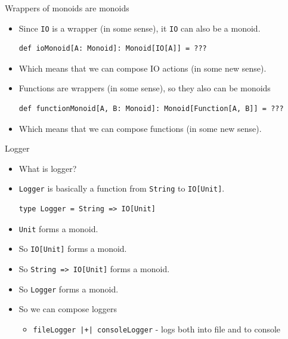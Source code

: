 \documentclass[presentation,aspectratio=169,smaller]{beamer}
\begin{document}
\begin{frame}[label={sec:org0d68a65},fragile]{Wrappers of monoids are monoids}
 \begin{itemize}
\item <1-> Since \texttt{IO} is a wrapper (in some sense), it \texttt{IO} can also be a monoid.
\begin{verbatim}
def ioMonoid[A: Monoid]: Monoid[IO[A]] = ???
\end{verbatim}
\item <2-> Which means that we can compose IO actions (in some new sense).
\item <3-> Functions are wrappers (in some sense), so they also can be monoids
\begin{verbatim}
def functionMonoid[A, B: Monoid]: Monoid[Function[A, B]] = ???
\end{verbatim}
\item <4-> Which means that we can compose functions (in some new sense).
\end{itemize}
\end{frame}

\begin{frame}[label={sec:org26cdb0f},fragile]{Logger}
 \begin{itemize}
\item <1-> What is logger?
\item <2-> \texttt{Logger} is basically a function from \texttt{String} to \texttt{IO[Unit]}.
\begin{verbatim}
type Logger = String => IO[Unit]
\end{verbatim}
\item <3-> \texttt{Unit} forms a monoid.
\item <4-> So \texttt{IO[Unit]} forms a monoid.
\item <5-> So \texttt{String => IO[Unit]} forms a monoid.
\item <6-> So \texttt{Logger} forms a monoid.
\item <7-> So we can compose loggers
\begin{itemize}
\item \texttt{fileLogger |+| consoleLogger} - logs both into file and to console
\end{itemize}
\end{itemize}
\end{frame}
\end{document}
